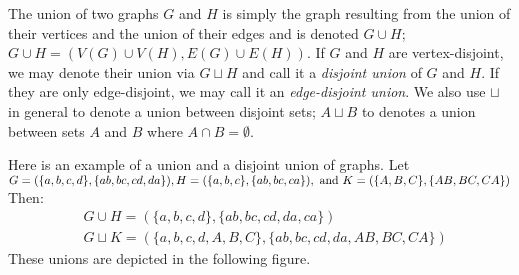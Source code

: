 \begin{definition}
The union of two graphs $G$ and $H$ is simply the graph resulting from the union of their vertices and the union of their edges and is denoted $G\cup H$; $G\cup H=(V(G)\cup V(H),E(G)\cup E(H))$. If $G$ and $H$ are vertex-disjoint, we may denote their union via $G\sqcup H$ and call it a \textit{disjoint union} of $G$ and $H$. If they are only edge-disjoint, we may call it an \textit{edge-disjoint union}. We also use $\sqcup$ in general to denote a union between disjoint sets; $A\sqcup B$ to denotes a union between sets $A$ and $B$ where $A\cap B=\emptyset$.
\end{definition} Here is an example of a union and a disjoint union of graphs. Let $G=(\{a,b,c,d\},\{ab,\newline bc,cd,da\}),H=(\{a,b,c\},\{ab,bc,ca\}),\text{ and }K=(\{A,B,C\},\{AB,BC,CA\})$ Then:
\begin{align*}
&G\cup H = (\{a,b,c,d\},\{ab,bc,cd,da,ca\})\\
&G\sqcup K=(\{a,b,c,d,A,B,C\},\{ab,bc,cd,da,AB,BC,CA\})
\end{align*}
These unions are depicted in the following figure.
